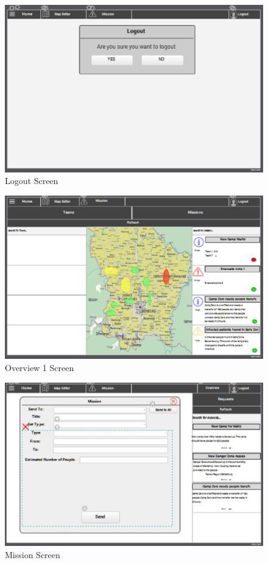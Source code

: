 \begin{figure}[htbp]
\begin{center}
 \caption{\label{fig:W5} Logout Screen}
   \includegraphics[width=150mm]{./images/Web/logout.eps}
\end{center}
\end{figure}
\begin{figure}[htbp]
\begin{center}
 \caption{\label{fig:W6} Overview 1 Screen}
   \includegraphics[width=150mm]{./images/Web/coverview2.eps}
\end{center}
\end{figure}
\begin{figure}[htbp]
\begin{center}
 \caption{\label{fig:W8} Mission Screen}
   \includegraphics[width=150mm]{./images/Web/cmissionscreen.eps}
\end{center}
\end{figure}
